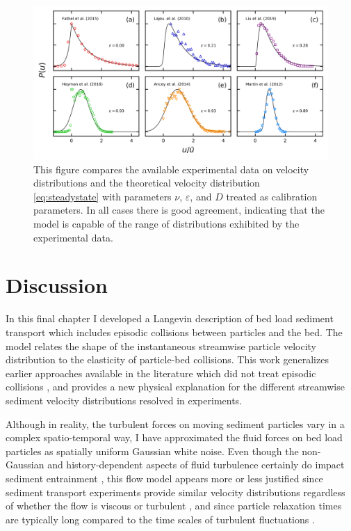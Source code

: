 \begin{figure}
	\centerline{\includegraphics{./figures/ch5/Fig4expComparison.png}}
	\caption{This figure compares the available experimental data on velocity distributions and the theoretical velocity distribution \ref{eq:steadystate} with parameters $\nu$, $\varepsilon$, and $D$ treated as calibration parameters. In all cases there is good agreement, indicating that the model is capable of the range of distributions exhibited by the experimental data.} \label{fig:fig4ch5}
\end{figure}


\section{Discussion}
\label{sec:langdiscussion}

In this final chapter I developed a Langevin description of bed load sediment transport which includes episodic collisions between particles and the bed.
The model relates the shape of the instantaneous streamwise particle velocity distribution to the elasticity of particle-bed collisions.
This work generalizes earlier approaches available in the literature which did not treat episodic collisions \citep{Ancey2014,Fan2014}, and provides a new physical explanation for the different streamwise sediment velocity distributions resolved in experiments.

Although in reality, the turbulent forces on moving sediment particles vary in a complex spatio-temporal way, I have approximated the fluid forces on bed load particles as spatially uniform Gaussian white noise. Even though the non-Gaussian and history-dependent aspects of fluid turbulence certainly do impact sediment entrainment \citep{Cameron2020,Celik2014}, this flow model appears more or less justified since sediment transport experiments provide similar velocity distributions regardless of whether the flow is viscous or turbulent \citep{Lajeunesse2010, Charru2004}, and since particle relaxation times are typically long compared to the time scales of turbulent fluctuations \citep{Hofland2006,Schmeeckle2007,Nakagawa1981}.

